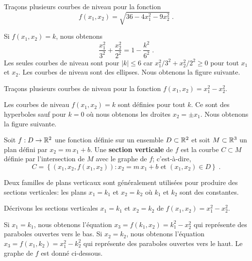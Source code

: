 {\begin{egg}
Traçons plusieurs courbes de niveau pour la fonction
\[
f(x_1,x_2) = \sqrt{36-4x_1^2-9x_2^2} \; .
\]

Si $f(x_1,x_2)=k$, nous obtenons
\[
\frac{x_1^2}{3^2} + \frac{x_2^2}{2^2} = 1- \frac{k^2}{6^2} \; .
\]
Les seules courbes de niveau sont pour $|k| \leq 6$ car
$x_1^2/3^2 + x_2^2/2^2 \geq 0$ pour tout $x_1$ et $x_2$.  Les courbes de
niveau sont des ellipses.  Nous obtenons la figure suivante.
\end{egg}

\begin{egg}
Traçons plusieurs courbes de niveau pour la fonction
$f(x_1,x_2) = x_1^2-x_2^2$.

Les courbes de niveau $f(x_1,x_2)=k$ sont
définies pour tout $k$.  Ce sont des hyperboles sauf pour
$k=0$ où nous obtenons les droites $x_2= \pm x_1$.  Nous obtenons la figure
suivante.
\end{egg}


\begin{focus}{\dfn}
Soit $f:D\rightarrow \mathbb{R}^2$ une fonction définie sur un ensemble
$D\subset \mathbb{R}^2$ et soit $M \subset \mathbb{R}^3$ un plan défini par
$x_2=m\,x_1+b$.  Une
{\bfseries section verticale} de $f$ est la
courbe $C \subset M$ définie par l'intersection de $M$ avec le graphe
de $f$; c'est-à-dire,
\[
C = \left\{ \left(x_1, x_2, f(x_1, x_2)\right) : x_2 = m\,x_1+b \text{ et }
(x_1,x_2) \in D \right\} \; .
\]
\end{focus}

Deux familles de plans verticaux sont généralement utilisées pour
produire des sections verticales: les plans $x_1=k_1$ et $x_2=k_2$ où
$k_1$ et $k_2$ sont des constantes.

\begin{egg}
Décrivons les sections verticales $x_1=k_1$ et $x_2=k_2$ de
$f(x_1,x_2) = x_1^2-x_2^2$.

Si $x_1=k_1$, nous obtenons l'équation $x_3=f(k_1,x_2)=k_1^2-x_2^2$
qui représente des paraboles ouvertes vers le bas.  Si $x_2=k_2$, nous
obtenons l'équation $x_3=f(x_1,k_2)=x_1^2-k_2^2$ qui représente des
paraboles ouvertes vers le haut.  Le graphe de $f$ est donné
ci-dessous.
\end{egg}

}
